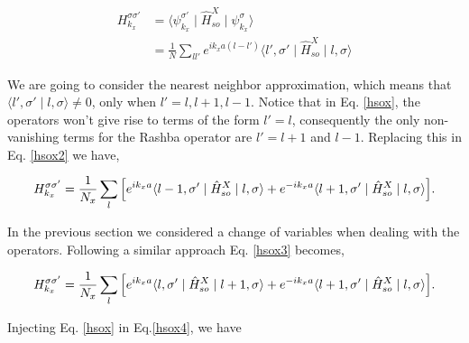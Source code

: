 \documentclass[10pt,prb,showpacs,amssymb,floatfix]{revtex4-1}
\begin{document}
\begin{align}
H_{k_x}^{\sigma \sigma'} &= \langle \psi^{\sigma'}_{k_x} \mid \hat H^X_{so} \mid \psi^\sigma_{k_x} \rangle \\
&= \frac{1}{N}\sum_{l l'} e^{i k_x a (l-l')} \langle l',\sigma' \mid \hat{H}^X_{so} \mid l,\sigma\rangle
\label{hsox2}
\end{align}

We are going to consider the nearest neighbor approximation, which means that $\langle l',\sigma' \mid l,\sigma\rangle \neq 0$, only when $l' = l,l+1,l-1$. Notice that in Eq. \eqref{hsox}, the operators won't give rise to terms of the form $l'=l$, consequently the only non-vanishing terms for the Rashba operator are $l'=l+1$ and $l-1$. Replacing this in Eq. \eqref{hsox2} we have,

\begin{align}
H_{k_x}^{\sigma \sigma'} = \frac{1}{N_x}\sum_{l} \Big{[} e^{i k_x a} \langle l-1,\sigma' \mid \hat{H}^X_{so} \mid l,\sigma\rangle + e^{-i k_x a} \langle l+1,\sigma' \mid \hat{H}^X_{so} \mid l,\sigma\rangle \Big{]}.
\label{hsox3}
\end{align}

In the previous section we considered a change of variables when dealing with the operators. Following a similar approach Eq. \eqref{hsox3} becomes,

\begin{align}
H_{k_x}^{\sigma \sigma'} = \frac{1}{N_x}\sum_{l} \Big{[} e^{i k_x a} \langle l,\sigma' \mid \hat{H}^X_{so} \mid l+1,\sigma\rangle + e^{-i k_x a} \langle l+1,\sigma' \mid \hat{H}^X_{so} \mid l,\sigma\rangle \Big{]}.
\label{hsox4}
\end{align}

Injecting Eq. \eqref{hsox} in Eq.\eqref{hsox4}, we have
\end{document}
